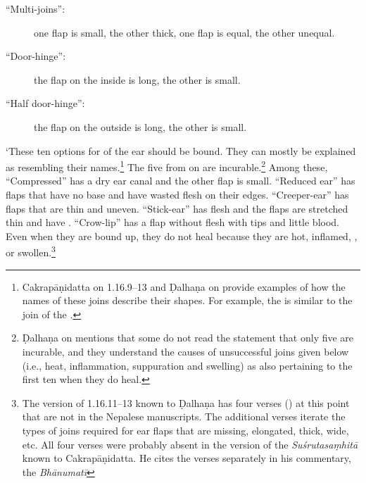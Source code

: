 \begin{translation}
\begin{description}
\item[\mdseries``Multi-joins'':]
        one flap is small, the other thick, one flap is equal, the other unequal.
        
\item[\mdseries``Door-hinge'':]
        the flap on the inside is long, the other is small.
        
\item[\mdseries``Half door-hinge'':]
        the flap on the outside is long, the other is small.
    \end{description}

`These ten options for  of the ear should be
bound.  They can mostly be explained as resembling their
names.\footnote{Cakrapāṇidatta on 1.16.9–13 \citep[128–129]{acar-1939} and Ḍalhaṇa
    on  provide examples of how the names of these joins describe
    their shapes. For example, the  is similar to the
    join of the .}  The five from
     on are incurable.\footnote{Ḍalhaṇa on
         mentions that some do not read the statement that only five
        are incurable, and they understand the causes of unsuccessful joins given below
        (i.e., heat, inflammation, suppuration and swelling) as also pertaining to the
        first ten when they do heal.}  Among these, “Compressed” has a dry ear canal and
        the other flap is small.   “Reduced ear” has flaps that have no base and have
        wasted flesh on their edges. “Creeper-ear” has flaps that are thin and uneven.
        “Stick-ear” has  flesh and the flaps are stretched thin 
        and
        have  .  “Crow-lip” has a flap 
        without flesh
        with  tips and little blood. Even when they are 
        bound
        up, they do not heal because they are hot, inflamed, 
        , or
        swollen.\footnote{The version of 1.16.11–13 known to Ḍalhaṇa \citep[78]{vulgate}
            has four verses () at this point that are not in the Nepalese
            manuscripts. The additional verses iterate the types of joins required for ear
            flaps that are missing, elongated, thick, wide, etc. All four verses were probably
            absent in the version of the \emph{Suśrutasaṃhitā} known to Cakrapāṇidatta. He
            cites the verses separately in his commentary, the \emph{Bhānumatī}
}
\end{translation}
